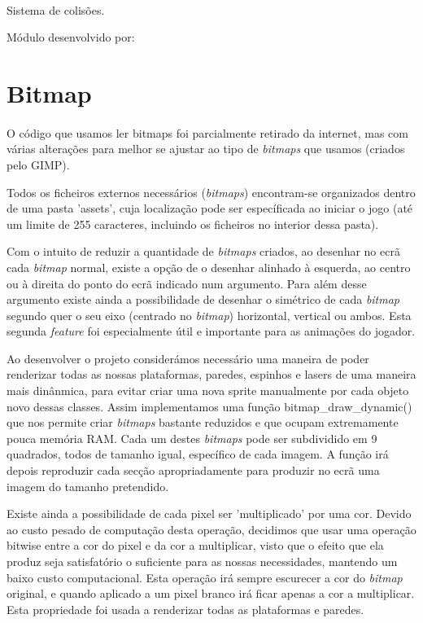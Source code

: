 \documentclass{report}
\begin{document}
\paragraph{}
Sistema de colisões. \newline

Módulo desenvolvido por: 

\section{Bitmap}

\paragraph{}
O código que usamos ler bitmaps foi parcialmente retirado da internet, mas com várias alterações para melhor se ajustar ao tipo de \textit{bitmaps} que usamos (criados pelo GIMP).

Todos os ficheiros externos necessários (\textit{bitmaps}) encontram-se organizados dentro de uma pasta 'assets', cuja localização pode ser específicada ao iniciar o jogo (até um limite de 255 caracteres, incluindo os ficheiros no interior dessa pasta).

Com o intuito de reduzir a quantidade de \textit{bitmaps} criados, ao desenhar no ecrã cada \textit{bitmap} normal, existe a opção de o desenhar alinhado à esquerda, ao centro ou à direita do ponto do ecrã indicado num argumento. Para além desse argumento existe ainda a possibilidade de desenhar o simétrico de cada \textit{bitmap} segundo quer o seu eixo (centrado no \textit{bitmap}) horizontal, vertical ou ambos. Esta segunda \textit{feature} foi especialmente útil e importante para as animações do jogador. 

Ao desenvolver o projeto considerámos necessário uma maneira de poder renderizar todas as nossas plataformas, paredes, espinhos e lasers de uma maneira mais dinânmica, para evitar criar uma nova sprite manualmente por cada objeto novo dessas classes. Assim implementamos uma função bitmap\_draw\_dynamic() que nos permite criar \textit{bitmaps} bastante reduzidos e que ocupam extremamente pouca memória RAM. Cada um destes \textit{bitmaps} pode ser subdividido em 9 quadrados, todos de tamanho igual, específico de cada imagem. A função irá depois reproduzir cada secção apropriadamente para produzir no ecrã uma imagem do tamanho pretendido.

Existe ainda a possibilidade de cada pixel ser 'multiplicado' por uma cor. Devido ao custo pesado de computação desta operação, decidimos que usar uma operação bitwise entre a cor do pixel e da cor a multiplicar, visto que o efeito que ela produz seja satisfatório o suficiente para as nossas necessidades, mantendo um baixo custo computacional. Esta operação irá sempre escurecer a cor do \textit{bitmap} original, e quando aplicado a um pixel branco irá ficar apenas a cor a multiplicar. Esta propriedade foi usada a renderizar todas as plataformas e paredes. 
\end{document}
